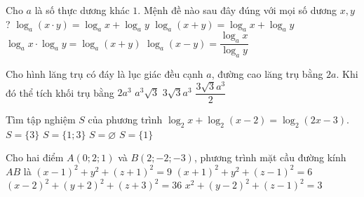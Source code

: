 \begin{ex}%
Cho $a$ là số thực dương khác $1$. Mệnh đề nào sau đây đúng với mọi số dương $x,y$?
\choice
{\True $\log_a(x\cdot y) = \log_a x + \log_a y$}
{$\log_a (x+y) = \log_a x + \log_a y$}
{$\log_a x \cdot \log_a y = \log_a (x+y)$}
{$\log_a (x-y) = \dfrac{\log_a x}{\log_a y} $}
\end{ex}

\begin{ex}%
Cho hình lăng trụ có đáy là lục giác đều cạnh $a$, đường cao lăng trụ bằng $2a$. Khi đó thể tích khối trụ bằng
\choice
{$2a^3$}
{$a^3 \sqrt{3}$}
{\True $3\sqrt{3}a^3$}
{$\dfrac{3\sqrt{3}a^3}{2}$}
\end{ex}

\begin{ex}%
Tìm tập nghiệm $S$ của phương trình $\log_2 x + \log_2 (x-2) = \log_2 (2x-3)$.
\choice
{\True $S=\{3\}$}
{$S=\{1;3\}$}
{$S=\varnothing$}
{$S=\{1\}$}
\end{ex}

\begin{ex}%
Cho hai điểm $A(0;2;1)$ và $B(2;-2;-3)$, phương trình mặt cầu đường kính $AB$ là
\choice
{\True $(x-1)^2 + y^2 + (z+1)^2 = 9$}
{$(x+1)^2 + y^2 + (z-1)^2 = 6$}
{$(x-2)^2 + (y+2)^2 + (z+3)^2 = 36$}
{$x^2 + (y-2)^2 + (z-1)^2 = 3$}
\end{ex}

